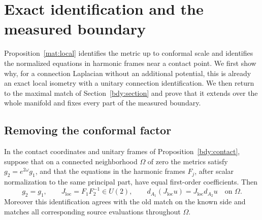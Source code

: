 \section{Exact identification and the measured boundary}
\label{glob:section}\label{sec:global}

Proposition~\ref{mat:local} identifies the metric up to conformal
scale and identifies the normalized equations in harmonic frames
near a contact point.  We first show why, for a connection
Laplacian without an additional potential, this is already an
exact local isometry with a unitary connection identification.
We then return to the maximal match of Section~\ref{bdy:section}
and prove that it extends over the whole manifold and fixes every
part of the measured boundary.

\subsection{Removing the conformal factor}

\begin{lemma}\label{glob:conformal}
In the contact coordinates and unitary frames of
Proposition~\ref{bdy:contact}, suppose that on a connected
neighborhood \(\Omega\) of zero the metrics satisfy
\(g_2=e^{2\omega}g_1\), and that the equations in the harmonic
frames \(F_j\), after scalar normalization to the same principal
part, have equal first-order coefficients.  Then
\[
 g_2=g_1,\qquad J_{\mathrm{loc}}=F_1F_2^{-1}\in U(2),\qquad
 d_{A_1}(J_{\mathrm{loc}}u)=J_{\mathrm{loc}}d_{A_2}u
                         \quad\text{on }\Omega.
\]
Moreover this identification agrees with the old match on the
known side and matches all corresponding source evaluations
throughout \(\Omega\).
\end{lemma}

